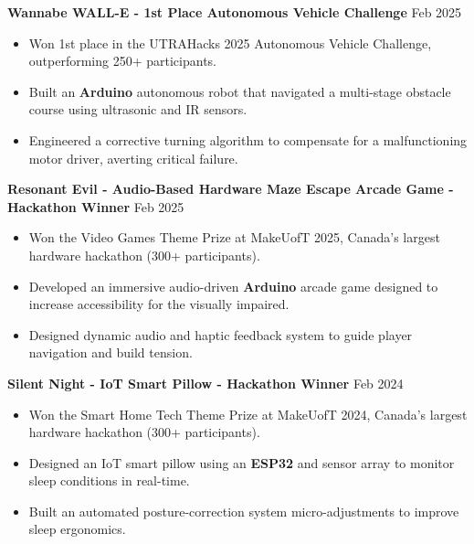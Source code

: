 \documentclass[10pt,letterpaper]{article}
\begin{document}
\textbf{Wannabe WALL-E - 1st Place Autonomous Vehicle Challenge} \hfill Feb 2025 \\
\begin{itemize}
    \item Won 1st place in the UTRAHacks 2025 Autonomous Vehicle Challenge, outperforming 250+ participants. 
    \item Built an \textbf{Arduino} autonomous robot that navigated a multi-stage obstacle course using ultrasonic and IR sensors.
    \item Engineered a corrective turning algorithm to compensate for a malfunctioning motor driver, averting critical failure. 
\end{itemize}


\textbf{Resonant Evil - Audio-Based Hardware Maze Escape Arcade Game - Hackathon Winner} \hfill Feb 2025 \\
\begin{itemize}
    \item Won the Video Games Theme Prize at MakeUofT 2025, Canada's largest hardware hackathon (300+ participants). 
    \item Developed an immersive audio-driven \textbf{Arduino} arcade game designed to increase accessibility for the visually impaired.
    \item Designed dynamic audio and haptic feedback system to guide player navigation and build tension. 
\end{itemize}




\textbf{Silent Night - IoT Smart Pillow - Hackathon Winner} \hfill Feb 2024 \\
\begin{itemize}
    \item Won the Smart Home Tech Theme Prize at MakeUofT 2024, Canada's largest hardware hackathon (300+ participants).  
    \item Designed an IoT smart pillow using an \textbf{ESP32} and sensor array to monitor sleep conditions in real-time.
    \item Built an automated posture-correction system micro-adjustments to improve sleep ergonomics. 
\end{itemize}




\end{document}
